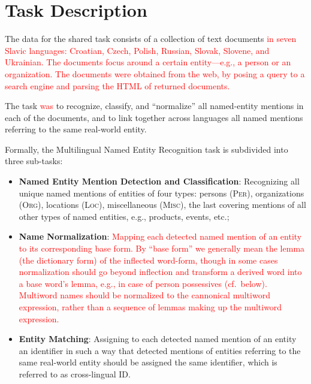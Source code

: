 \documentclass[11pt]{article}
\newcommand{\alert}[1]{\textcolor{red}{#1}}
\begin{document}
\section{Task Description}
\label{sec:task}


The data for the shared task consists of a collection of text documents
\alert{in seven Slavic languages: Croatian, Czech, Polish, Russian, Slovak,
	Slovene, and Ukrainian. The documents focus around a certain
	entity---e.g., a person or an organization. The documents were obtained
from the web, by posing a query to a search engine and parsing the HTML of
returned documents.}

The task \alert{was} to recognize, classify, and ``normalize'' all named-entity mentions
in each of the documents, and to link together across languages all named
mentions referring to the same real-world entity.

Formally, the Multilingual Named Entity
Recognition task is subdivided into three sub-tasks:

\begin{itemize}

\item \textbf{Named Entity Mention Detection and Classification}:
  Recognizing all unique named mentions of entities of four types:
  persons (\textsc{Per}), organizations (\textsc{Org}), locations (\textsc{Loc}), miscellaneous
  (\textsc{Misc}), the last covering mentions of all other types of named
  entities, e.g., products, events, etc.;

\item \textbf{Name Normalization}: \alert{Mapping each detected named mention
	of an entity to its corresponding base form. By ``base form'' we
	generally mean the lemma (the dictionary form) of the inflected
	word-form, though in some cases normalization should go beyond
	inflection and transform a derived word into a base word's lemma, e.g., in case of person possessives (cf.~below). Multiword names should be normalized to the cannonical
multiword expression, rather than a sequence of lemmas making up the multiword
expression.}

\item \textbf{Entity Matching}: Assigning to each detected named mention of an entity an identifier in such a way that detected 
  mentions of entities referring to the same real-world entity should be assigned the same identifier, which is referred to as 
  cross-lingual ID.

\end{itemize}
\end{document}

